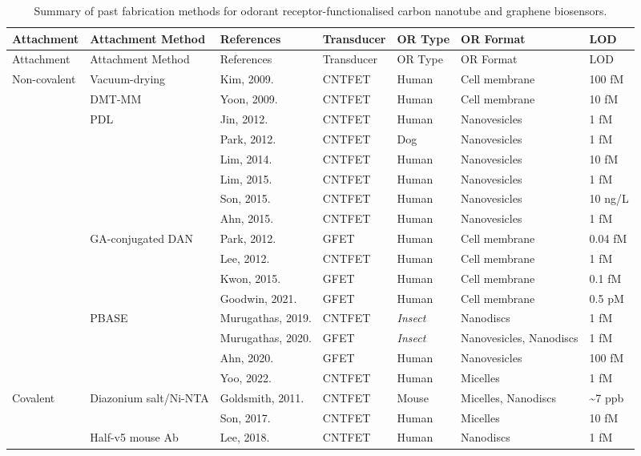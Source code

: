 \documentclass[
  a4paper,
]{scrbook}
\begin{document}
\begin{landscape}
\begin{center}

\hypertarget{tbl-or-biosensors}{}
\begin{longtable}[]{@{}lllllll@{}}
\caption{\label{tbl-or-biosensors}Summary of past fabrication methods
for odorant receptor-functionalised carbon nanotube and graphene
biosensors.}\tabularnewline
\toprule\noalign{}
Attachment & Attachment Method & References & Transducer & OR Type & OR
Format & LOD \\
\midrule\noalign{}
\endfirsthead
\toprule\noalign{}
Attachment & Attachment Method & References & Transducer & OR Type & OR
Format & LOD \\
\midrule\noalign{}
\endhead
\bottomrule\noalign{}
\endlastfoot
Non-covalent & Vacuum-drying & Kim, 2009. \cite{Kim2009a} & CNTFET &
Human & Cell membrane & 100 fM \\
& DMT-MM & Yoon, 2009. \cite{Yoon2009} & CNTFET & Human & Cell membrane
& 10 fM \\
& PDL & Jin, 2012. \cite{Jin2012} & CNTFET & Human & Nanovesicles & 1
fM \\
& & Park, 2012. \cite{Park2012a} & CNTFET & Dog & Nanovesicles & 1 fM \\
& & Lim, 2014. \cite{Lim2014} & CNTFET & Human & Nanovesicles & 10 fM \\
& & Lim, 2015. \cite{Lim2015} & CNTFET & Human & Nanovesicles & 1 fM \\
& & Son, 2015. \cite{Son2015} & CNTFET & Human & Nanovesicles & 10
ng/L \\
& & Ahn, 2015. \cite{Ahn2015} & CNTFET & Human & Nanovesicles & 1 fM \\
& GA-conjugated DAN & Park, 2012. \cite{Park2012} & GFET & Human & Cell
membrane & 0.04 fM \\
& & Lee, 2012. \cite{Lee2012b} & CNTFET & Human & Cell membrane & 1
fM \\
& & Kwon, 2015. \cite{Kwon2015} & GFET & Human & Cell membrane & 0.1
fM \\
& & Goodwin, 2021. \cite{Goodwin2021} & GFET & Human & Cell membrane &
0.5 pM \\
& PBASE & Murugathas, 2019. \cite{Murugathas2019a} & CNTFET &
\textit{Insect} & Nanodiscs & 1 fM \\
& & Murugathas, 2020. \cite{Murugathas2020} & GFET & \textit{Insect} &
Nanovesicles, Nanodiscs & 1 fM \\
& & Ahn, 2020. \cite{Ahn2020} & GFET & Human & Nanovesicles & 100 fM \\
& & Yoo, 2022. \cite{Yoo2022} & CNTFET & Human & Micelles & 1 fM \\
Covalent & Diazonium salt/Ni-NTA & Goldsmith, 2011. \cite{Goldsmith2011}
& CNTFET & Mouse & Micelles, Nanodiscs & \textasciitilde7 ppb \\
& & Son, 2017. \cite{Son2017} & CNTFET & Human & Micelles & 10 fM \\
& Half-v5 mouse Ab & Lee, 2018. \cite{Lee2018} & CNTFET & Human &
Nanodiscs & 1 fM \\
\end{longtable}


\end{center}
\end{landscape}
\end{document}
